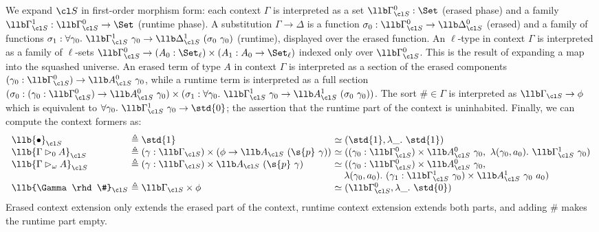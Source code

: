 \documentclass[a4paper,UKenglish,cleveref,autoref,thm-restate]{lipics-v2021}
\begin{document}
We expand $\cl S$ in first-order morphism form: each context $\Gamma$ is interpreted as a set
$\llb\Gamma^0_{\cl S} : \Set$ (erased phase) and a family $\llb\Gamma^1_{\cl S} : \llb\Gamma^0_{\cl S} \to \Set$
(runtime phase). A substitution $\Gamma \to \Delta$ is a function $\sigma_0 :
\llb\Gamma^0_{\cl S} \to \llb\Delta^0_{\cl S}$ (erased) and a family of functions $\sigma_1 : \forall \gamma_0.\
\llb\Gamma^1_{\cl S}\ \gamma_0 \to \llb\Delta^1_{\cl S}\ (\sigma_0\ \gamma_0)$ (runtime), displayed over
the erased function. An $\ell$-type in context $\Gamma$ is interpreted as a
family of $\ell$-sets $\llb\Gamma^0_{\cl S} \to (A_0 : \Set_\ell) \times (A_1 : A_0 \to
\Set_\ell)$ indexed only over $\llb\Gamma^0_{\cl S}$. This is the result of expanding a map
into the squashed universe. An erased term of type $A$ in context $\Gamma$ is
interpreted as a section of the erased components $(\gamma_0 : \llb\Gamma^0_{\cl S}) \to
\llb A^0_{\cl S}\ \gamma_0$, while a runtime term is interpreted as a full section $(\sigma_0
: (\gamma_0 : \llb\Gamma^0_{\cl S}) \to \llb A^0_{\cl S}\ \gamma_0) \times (\sigma_1 : \forall \gamma_0.\
\llb\Gamma^1_{\cl S}\ \gamma_0 \to \llb A^1_{\cl S}\ (\sigma_0\ \gamma_0))$. The sort $\# \in \Gamma$ is
interpreted as $\llb\Gamma_{\cl S} \to \phi$ which is equivalent to $\forall
\gamma_0.\ \llb\Gamma^1_{\cl S}\ \gamma_0 \to \std{0}$; the assertion that the runtime part
of the context is uninhabited. Finally, we can compute the context formers as:
\[\begin{array}{l@{\ }l@{\ }l}
\llb{\bullet}_{\cl S} &\triangleq \std{1}
  &\simeq (\std{1}, \lambda\_.\ \std{1}) \\
\llb{\Gamma \rhd_0 A}_{\cl S} &\triangleq (\gamma : \llb\Gamma_{\cl S}) \times (\phi \to \llb A_{\cl S}\ (\s{p}\ \gamma))
  &\simeq ((\gamma_0 : \llb\Gamma^0_{\cl S}) \times \llb A^0_{\cl S}\ \gamma_0,\ \lambda (\gamma_0, a_0).\ \llb\Gamma^1_{\cl S}\ \gamma_0) \\
\llb{\Gamma \rhd_\omega A}_{\cl S} &\triangleq (\gamma : \llb\Gamma_{\cl S}) \times \llb A_{\cl S}\ (\s{p}\ \gamma)
  &\simeq ((\gamma_0 : \llb\Gamma^0_{\cl S}) \times \llb A^0_{\cl S}\ \gamma_0,\\
  &&\quad \lambda (\gamma_0, a_0).\ (\gamma_1 : \llb\Gamma^1_{\cl S}\ \gamma_0) \times \llb A^1_{\cl S}\ \gamma_0\ a_0) \\
\llb{\Gamma \rhd \#}_{\cl S} &\triangleq \llb\Gamma_{\cl S} \times \phi &\simeq (\llb\Gamma^0_{\cl S}, \lambda\_.\ \std{0})
\end{array}\]
Erased context extension only extends the erased part of the context, runtime
context extension extends both parts, and adding $\#$ makes the runtime part
empty.
\end{document}
